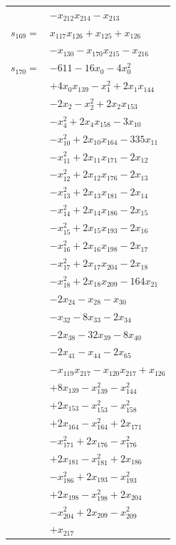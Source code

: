 \begin{longtable}{@{}r@{\;}l@{}}
 & \(\displaystyle -x_{212}x_{214} -x_{213}\) \\[3pt]
\(s_{169}=\) & \(\displaystyle x_{117}x_{126} +x_{125} +x_{126}\) \\
 & \(\displaystyle -x_{130} -x_{170}x_{215} -x_{216}\) \\[3pt]
\(s_{170}=\) & \(\displaystyle -611 -16x_{0} -4x_{0}^{2}\) \\
 & \(\displaystyle +4x_{0}x_{139} -x_{1}^{2} +2x_{1}x_{144}\) \\
 & \(\displaystyle -2x_{2} -x_{2}^{2} +2x_{2}x_{153}\) \\
 & \(\displaystyle -x_{4}^{2} +2x_{4}x_{158} -3x_{10}\) \\
 & \(\displaystyle -x_{10}^{2} +2x_{10}x_{164} -335x_{11}\) \\
 & \(\displaystyle -x_{11}^{2} +2x_{11}x_{171} -2x_{12}\) \\
 & \(\displaystyle -x_{12}^{2} +2x_{12}x_{176} -2x_{13}\) \\
 & \(\displaystyle -x_{13}^{2} +2x_{13}x_{181} -2x_{14}\) \\
 & \(\displaystyle -x_{14}^{2} +2x_{14}x_{186} -2x_{15}\) \\
 & \(\displaystyle -x_{15}^{2} +2x_{15}x_{193} -2x_{16}\) \\
 & \(\displaystyle -x_{16}^{2} +2x_{16}x_{198} -2x_{17}\) \\
 & \(\displaystyle -x_{17}^{2} +2x_{17}x_{204} -2x_{18}\) \\
 & \(\displaystyle -x_{18}^{2} +2x_{18}x_{209} -164x_{21}\) \\
 & \(\displaystyle -2x_{24} -x_{28} -x_{30}\) \\
 & \(\displaystyle -x_{32} -8x_{33} -2x_{34}\) \\
 & \(\displaystyle -2x_{38} -32x_{39} -8x_{40}\) \\
 & \(\displaystyle -2x_{41} -x_{44} -2x_{65}\) \\
 & \(\displaystyle -x_{119}x_{217} -x_{120}x_{217} +x_{126}\) \\
 & \(\displaystyle +8x_{139} -x_{139}^{2} -x_{144}^{2}\) \\
 & \(\displaystyle +2x_{153} -x_{153}^{2} -x_{158}^{2}\) \\
 & \(\displaystyle +2x_{164} -x_{164}^{2} +2x_{171}\) \\
 & \(\displaystyle -x_{171}^{2} +2x_{176} -x_{176}^{2}\) \\
 & \(\displaystyle +2x_{181} -x_{181}^{2} +2x_{186}\) \\
 & \(\displaystyle -x_{186}^{2} +2x_{193} -x_{193}^{2}\) \\
 & \(\displaystyle +2x_{198} -x_{198}^{2} +2x_{204}\) \\
 & \(\displaystyle -x_{204}^{2} +2x_{209} -x_{209}^{2}\) \\
 & \(\displaystyle +x_{217}\) \\[3pt]
\end{longtable}
\endgroup
